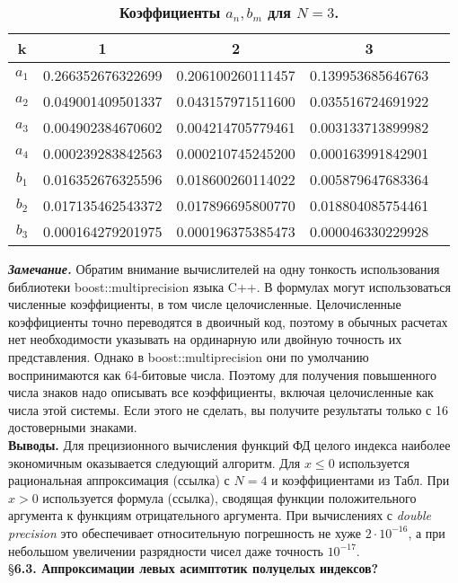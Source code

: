 \begin{table}[]
\caption{\textbf{Коэффициенты $a_n, b_m$ для $N = 3$.}}
\begin{center}
\begin{tabular}{|c|c|c|c|c|}
\hline
  k & 1 & 2 & 3 \\
\hline
 $a_1$ & 0.266352676322699 & 0.206100260111457 & 0.139953685646763 \\
 $a_2$ & 0.049001409501337 & 0.043157971511600 & 0.035516724691922 \\
 $a_3$ & 0.004902384670602 & 0.004214705779461 & 0.003133713899982 \\
 $a_4$ & 0.000239283842563 & 0.000210745245200 & 0.000163991842901 \\
\hline
 $b_1$ & 0.016352676325596 & 0.018600260114022 & 0.005879647683364 \\
 $b_2$ & 0.017135462543372 & 0.017896695800770 & 0.018804085754461 \\
 $b_3$ & 0.000164279201975 & 0.000196375385473 & 0.000046330229928 \\
\hline
\end{tabular}
\end{center}
\end{table}


\textbf{\textit{Замечание.}} Обратим внимание вычислителей на одну тонкость использования
библиотеки boost::multiprecision языка C++. В формулах могут использоваться численные коэффициенты, в том числе целочисленные. Целочисленные коэффициенты точно переводятся в двоичный код, поэтому в обычных расчетах нет необходимости указывать на ординарную или двойную точность их представления. Однако в boost::multiprecision они по умолчанию воспринимаются как 64-битовые числа. Поэтому для получения повышенного числа знаков надо описывать все коэффициенты, включая целочисленные
как числа этой системы. Если этого не сделать, вы получите результаты только с 16 достоверными знаками.
\\


\textbf{Выводы.} Для прецизионного вычисления функций ФД целого индекса наиболее экономичным оказывается следующий алгоритм. Для $x \leqslant 0$ используется рациональная аппроксимация (ссылка) с $N = 4$ и коэффициентами из Табл. При $x > 0$ используется формула (ссылка), сводящая функции положительного аргумента к функциям отрицательного аргумента. При вычислениях с \textit{double precision} это обеспечивает относительную погрешность не хуже $2 \cdot 10^{-16}$, а при небольшом увеличении разрядности чисел даже точность $10^{-17}$.
\\


\S \textbf{6.3. Аппроксимации левых асимптотик полуцелых индексов?}
\\


